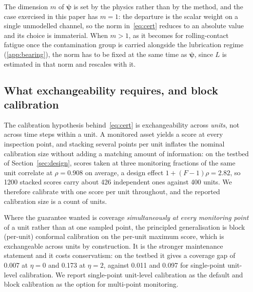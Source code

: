 \documentclass[review,times]{elsarticle}
\theoremstyle{definition}
\theoremstyle{remark}
\begin{document}
The dimension $m$ of $\boldsymbol\psi$ is set by the physics rather than by the method, and the case
exercised in this paper has $m=1$: the departure is the scalar weight on a single unmodelled
channel, so the norm in~\eqref{eq:cert} reduces to an absolute value and its choice is immaterial.
When $m>1$, as it becomes for rolling-contact fatigue once the contamination group is carried
alongside the lubrication regime (\ref{app:bearing}), the norm has to be fixed at the same time as
$\boldsymbol\psi$, since $L$ is estimated in that norm and rescales with it.

\subsection{What exchangeability requires, and block calibration}\label{sec:exch}
The calibration hypothesis behind~\eqref{eq:cert} is exchangeability across \emph{units}, not across
time steps within a unit. A monitored asset yields a score at every inspection point, and stacking
several points per unit inflates the nominal calibration size without adding a matching amount of
information: on the testbed of Section~\ref{sec:design}, scores taken at three monitoring fractions
of the same unit correlate at $\rho=0.908$ on average, a design effect $1+(F-1)\rho=2.82$, so 1200
stacked scores carry about 426 independent ones against 400 units. We therefore calibrate with one
score per unit throughout, and the reported calibration size is a count of units.

Where the guarantee wanted is coverage \emph{simultaneously at every monitoring point} of a unit
rather than at one sampled point, the principled generalisation is block (per-unit) conformal
calibration on the per-unit maximum score, which is exchangeable across units by construction. It
is the stronger maintenance statement and it costs conservatism: on the testbed it gives a coverage
gap of 0.007 at $\eta=0$ and 0.173 at $\eta=2$, against 0.011 and 0.097 for single-point unit-level
calibration. We report single-point unit-level calibration as the default and block calibration as
the option for multi-point monitoring.
\end{document}
